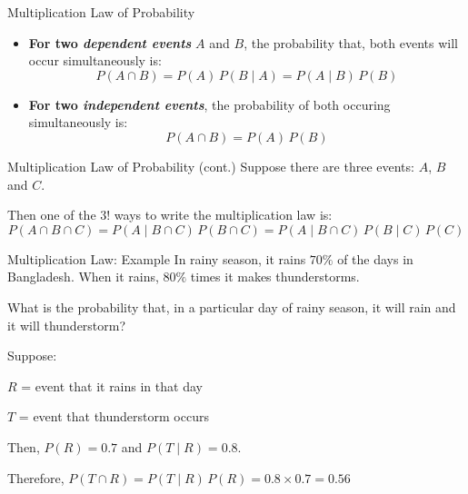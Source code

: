 \documentclass[12pt, aspectratio=169]{beamer}
\begin{document}
	\begin{frame}{Multiplication Law of Probability}
		\begin{itemize}
			\item \textbf{For two \emph{dependent events}} $A$ and $B$, the probability that, both events will occur simultaneously is:
			\[
				P(A \cap B) = P(A)\,P(B \mid A) = P(A \mid B) \, P(B)
			\]

			\item \textbf{For two \emph{independent events}}, the probability of both occuring simultaneously is:
			\[
				P(A \cap B) = P(A)\,P(B)
			\]
		\end{itemize}
	\end{frame}


	\begin{frame}{Multiplication Law of Probability (cont.)}
		Suppose there are three events: $A$, $B$ and $C$.

		Then one of the $3!$ ways to write the multiplication law is:
		\[
			P(A \cap B \cap C) = P(A \mid B \cap C) \, P(B \cap C) = P(A \mid B \cap C) \, P(B \mid C) \, P(C)
		\]
	\end{frame}


	\begin{frame}{Multiplication Law: Example}
		In rainy season, it rains $70\%$ of the days in Bangladesh. When it rains, $80\%$ times it makes thunderstorms.

		\vspace{0.5em}
		
		What is the probability that, in a particular day of rainy season, it will rain and it will thunderstorm?

		\vspace{1.5em}

		Suppose:

		$R$ = event that it rains in that day
		
		$T$ = event that thunderstorm occurs

		\vspace{0.5em}

		Then, $P(R) = 0.7$ and $P(T \mid R) = 0.8$.

		\vspace{0.5em}

		Therefore, $P(T \cap R) = P(T \mid R) \, P(R) = 0.8 \times 0.7 = 0.56$
	\end{frame}
\end{document}
